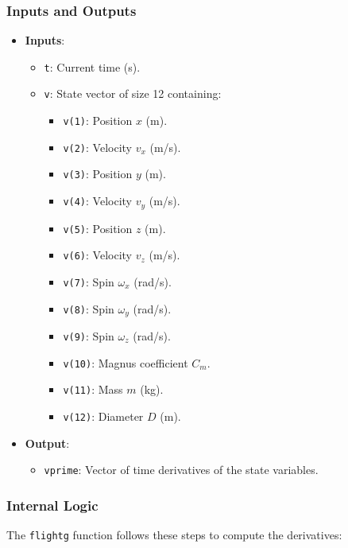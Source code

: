 \documentclass[10pt,a4paper]{report}
\begin{document}
\subsubsection{Inputs and Outputs}
\begin{itemize}
    \item \textbf{Inputs}:
    \begin{itemize}
        \item \texttt{t}: Current time (s).
        \item \texttt{v}: State vector of size 12 containing:
        \begin{itemize}
            \item \texttt{v(1)}: Position \(x\) (m).
            \item \texttt{v(2)}: Velocity \(v_x\) (m/s).
            \item \texttt{v(3)}: Position \(y\) (m).
            \item \texttt{v(4)}: Velocity \(v_y\) (m/s).
            \item \texttt{v(5)}: Position \(z\) (m).
            \item \texttt{v(6)}: Velocity \(v_z\) (m/s).
            \item \texttt{v(7)}: Spin \(\omega_x\) (rad/s).
            \item \texttt{v(8)}: Spin \(\omega_y\) (rad/s).
            \item \texttt{v(9)}: Spin \(\omega_z\) (rad/s).
            \item \texttt{v(10)}: Magnus coefficient \(C_m\).
            \item \texttt{v(11)}: Mass \(m\) (kg).
            \item \texttt{v(12)}: Diameter \(D\) (m).
        \end{itemize}
    \end{itemize}
    \item \textbf{Output}:
    \begin{itemize}
        \item \texttt{vprime}: Vector of time derivatives of the state variables.
    \end{itemize}
\end{itemize}

\subsubsection{Internal Logic}
The \texttt{flightg} function follows these steps to compute the derivatives:
\end{document}
